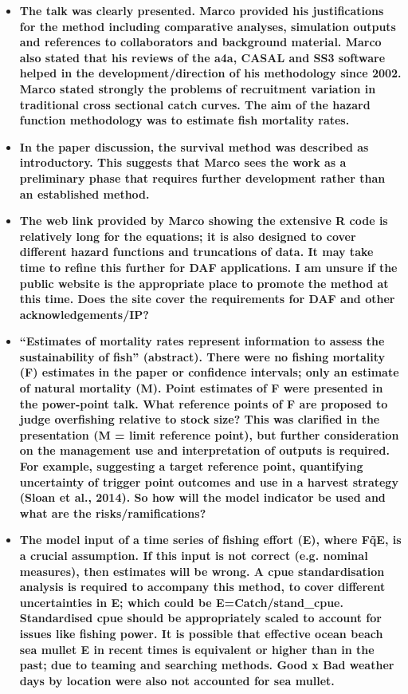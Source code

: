 \documentclass[11pt]{article}
\begin{document}
\begin{spacing}{1.2}
\begin{itemize}

\item {\bf The talk was clearly presented. Marco provided his justifications for the method including comparative analyses, simulation outputs and references to collaborators and background material. Marco also stated that his reviews of the a4a, CASAL and SS3 software helped in the development/direction of his methodology since 2002. Marco stated strongly the problems of recruitment variation in traditional cross sectional catch curves. The aim of the hazard function methodology was to estimate fish mortality rates.}

\item {\bf In the paper discussion, the survival method was described as introductory. This suggests that Marco sees the work as a preliminary phase that requires further development rather than an established method.}

\item {\bf The web link provided by Marco showing the extensive R code is relatively long for the equations; it is also designed to cover different hazard functions and truncations of data. It may take time to refine this further for DAF applications. I am unsure if the public website is the appropriate place to promote the method at this time. Does the site cover the requirements for DAF and other acknowledgements/IP?}

\item {\bf “Estimates of mortality rates represent information to assess the sustainability of fish” (abstract). There were no fishing mortality (F) estimates in the paper or confidence intervals; only an estimate of natural mortality (M). Point estimates of F were presented in the power-point talk. What reference points of F are proposed to judge overfishing relative to stock size? This was clarified in the presentation (M = limit reference point), but further consideration on the management use and interpretation of outputs is required. For example, suggesting a target reference point, quantifying uncertainty of trigger point outcomes and use in a harvest strategy (Sloan et al., 2014). So how will the model indicator be used and what are the risks/ramifications?}

\item {\bf The model input of a time series of fishing effort (E), where F\~qE, is a crucial assumption. If this input is not correct (e.g. nominal measures), then estimates will be wrong. A cpue standardisation analysis is required to accompany this method, to cover different uncertainties in E; which could be E=Catch/stand\_cpue. Standardised cpue should be appropriately scaled to account for issues like fishing power. It is possible that effective ocean beach sea mullet E in recent times is equivalent or higher than in the past; due to teaming and searching methods. Good x Bad weather days by location were also not accounted for sea mullet.}


\end{itemize}
\end{spacing}
\end{document}
